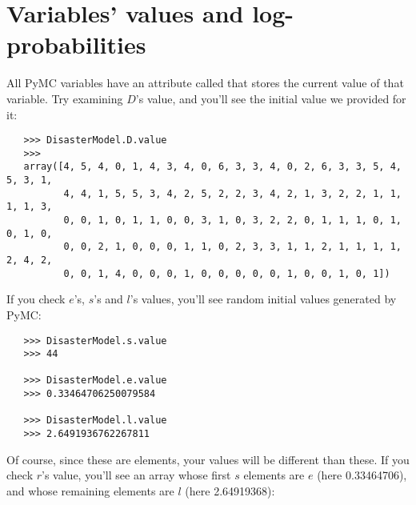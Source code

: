 \section{Variables' values and log-probabilities}
All PyMC variables have an attribute called  that stores the current value of that variable. Try examining $D$'s value, and you'll see the initial value we provided for it:
\begin{verbatim}
   >>> DisasterModel.D.value
   >>>
   array([4, 5, 4, 0, 1, 4, 3, 4, 0, 6, 3, 3, 4, 0, 2, 6, 3, 3, 5, 4, 5, 3, 1,
          4, 4, 1, 5, 5, 3, 4, 2, 5, 2, 2, 3, 4, 2, 1, 3, 2, 2, 1, 1, 1, 1, 3,
          0, 0, 1, 0, 1, 1, 0, 0, 3, 1, 0, 3, 2, 2, 0, 1, 1, 1, 0, 1, 0, 1, 0,
          0, 0, 2, 1, 0, 0, 0, 1, 1, 0, 2, 3, 3, 1, 1, 2, 1, 1, 1, 1, 2, 4, 2,
          0, 0, 1, 4, 0, 0, 0, 1, 0, 0, 0, 0, 0, 1, 0, 0, 1, 0, 1])
\end{verbatim}
If you check $e$'s, $s$'s and $l$'s values, you'll see random initial values generated by PyMC:
\begin{verbatim}
   >>> DisasterModel.s.value
   >>> 44

   >>> DisasterModel.e.value
   >>> 0.33464706250079584

   >>> DisasterModel.l.value
   >>> 2.6491936762267811
\end{verbatim}
Of course, since these are  elements, your values will be different than these. If you check $r$'s value, you'll see an array whose first $s$ elements are $e$ (here 0.33464706), and whose remaining elements are $l$ (here 2.64919368):

